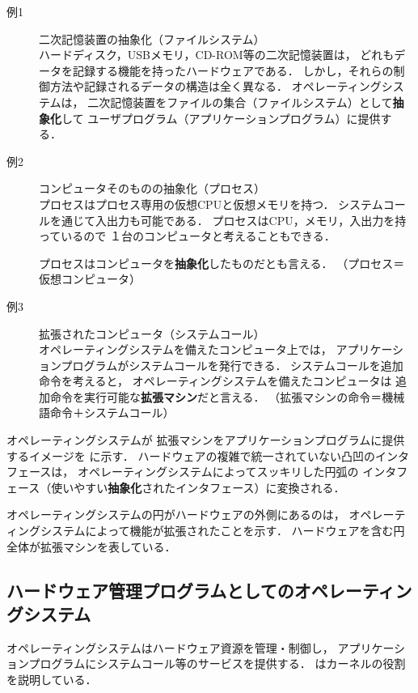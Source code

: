 \begin{description}
\item[例1] 二次記憶装置の抽象化（ファイルシステム） \\
ハードディスク，USBメモリ，CD-ROM等の二次記憶装置は，
どれもデータを記録する機能を持ったハードウェアである．
しかし，それらの制御方法や記録されるデータの構造は全く異なる．
オペレーティングシステムは，
二次記憶装置をファイルの集合（ファイルシステム）として{\bf 抽象化}して
ユーザプログラム（アプリケーションプログラム）に提供する．

\item[例2] コンピュータそのものの抽象化（プロセス） \\
プロセスはプロセス専用の仮想CPUと仮想メモリを持つ．
システムコールを通じて入出力も可能である．
プロセスはCPU，メモリ，入出力を持っているので
１台のコンピュータと考えることもできる．

プロセスはコンピュータを{\bf 抽象化}したものだとも言える．
（プロセス＝仮想コンピュータ）

\item[例3] 拡張されたコンピュータ（システムコール） \\
オペレーティングシステムを備えたコンピュータ上では，
アプリケーションプログラムがシステムコールを発行できる．
システムコールを追加命令を考えると，
オペレーティングシステムを備えたコンピュータは
追加命令を実行可能な{\bf 拡張マシン}だと言える．
（拡張マシンの命令＝機械語命令＋システムコール）
\end{description}

オペレーティングシステムが
拡張マシンをアプリケーションプログラムに提供するイメージを
に示す．
ハードウェアの複雑で統一されていない凸凹のインタフェースは，
オペレーティングシステムによってスッキリした円弧の
インタフェース（使いやすい{\bf 抽象化}されたインタフェース）に変換される．

オペレーティングシステムの円がハードウェアの外側にあるのは，
オペレーティングシステムによって機能が拡張されたことを示す．
ハードウェアを含む円全体が拡張マシンを表している．


\subsection{ハードウェア管理プログラムとしてのオペレーティングシステム}

オペレーティングシステムはハードウェア資源を管理・制御し，
アプリケーションプログラムにシステムコール等のサービスを提供する．
はカーネルの役割を説明している．


